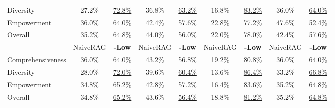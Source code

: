 \begin{table}[t]
{\begin{tabular}{@{}lcccccccc@{}}
Diversity              & 27.2\%      & \underline{72.8\%}     & 36.8\%      & \underline{63.2\%}     & 16.8\%      & \underline{83.2\%}     & 36.0\%      & \underline{64.0\%}     \\
Empowerment            & 36.0\%      & \underline{64.0\%}     & 42.4\%      & \underline{57.6\%}     & 22.8\%      & \underline{77.2\%}     & 47.6\%      & \underline{52.4\%}     \\
Overall                & 35.2\%      & \underline{64.8\%}     & 44.0\%      & \underline{56.0\%}     & 22.0\%      & \underline{78.0\%}     & 42.4\%      & \underline{57.6\%}     \\
\cmidrule(lr){2-3} \cmidrule(lr){4-5} \cmidrule(lr){6-7} \cmidrule(lr){8-9}
                      & NaiveRAG & \textbf{-Low} & NaiveRAG & \textbf{-Low} & NaiveRAG & \textbf{-Low} & NaiveRAG & \textbf{-Low} \\
\midrule
Comprehensiveness      & 36.0\%      & \underline{64.0\%}     & 43.2\%      & \underline{56.8\%}     & 19.2\%      & \underline{80.8\%}     & 36.0\%      & \underline{64.0\%}     \\
Diversity              & 28.0\%      & \underline{72.0\%}     & 39.6\%      & \underline{60.4\%}     & 13.6\%      & \underline{86.4\%}     & 33.2\%      & \underline{66.8\%}     \\
Empowerment            & 34.8\%      & \underline{65.2\%}     & 42.8\%      & \underline{57.2\%}     & 16.4\%      & \underline{83.6\%}     & 35.2\%      & \underline{64.8\%}     \\
Overall                & 34.8\%      & \underline{65.2\%}     & 43.6\%      & \underline{56.4\%}     & 18.8\%      & \underline{81.2\%}     & 35.2\%      & \underline{64.8\%}     \\


\end{tabular}}
\end{table}
